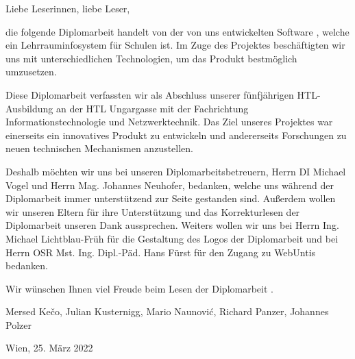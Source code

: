 
Liebe Leserinnen, liebe Leser,

die folgende Diplomarbeit handelt von der von uns entwickelten Software \ZELIA, welche ein Lehrrauminfosystem für Schulen ist. Im Zuge des Projektes beschäftigten wir uns mit unterschiedlichen Technologien, um das Produkt bestmöglich umzusetzen.

Diese Diplomarbeit verfassten wir als Abschluss unserer fünfjährigen HTL-Aus\-bildung an der HTL Ungargasse mit der Fachrichtung Informations\-technologie und Netzwerk\-tech\-nik. 
Das Ziel unseres Projektes war einerseits ein innovatives Produkt zu entwickeln und andererseits Forschungen zu neuen technischen Mechanismen anzustellen.

Deshalb möchten wir uns bei unseren Diplomarbeitsbetreuern, Herrn DI Michael Vogel und Herrn Mag. Johannes Neuhofer, bedanken, welche uns während der Diplomarbeit immer unterstützend zur Seite gestanden sind. 
Außerdem wollen wir unseren Eltern für ihre Unterstützung und das Korrekturlesen der Diplomarbeit unseren Dank aussprechen. 
Weiters wollen wir uns bei Herrn Ing. Michael Lichtblau-Früh für die Gestaltung des Logos der Diplomarbeit und bei Herrn OSR Mst. Ing. Dipl.-Päd. Hans Fürst für den Zugang zu WebUntis bedanken.

Wir wünschen Ihnen viel Freude beim Lesen der Diplomarbeit \ZELIA.

Mersed Kečo, Julian Kusternigg, Mario Naunović, Richard Panzer, Johannes Polzer

Wien, 25. März 2022
